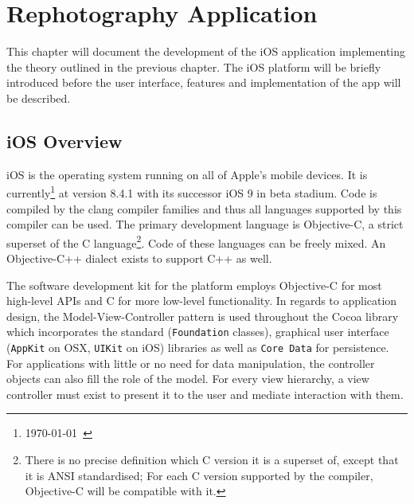 \chapter{Rephotography Application}

This chapter will document the development of the iOS application implementing
the theory outlined in the previous chapter. The iOS platform will be briefly
introduced before the user interface, features and implementation of the app
will be described.

\section{iOS Overview}
\newcommand*{\code}[1]{\texttt{#1}}

iOS is the operating system running on all of Apple's mobile devices. It is
currently\footnote{\today\ \citep{ios8}} at version 8.4.1 with its successor iOS
9 in beta stadium. Code is compiled by the clang compiler families and thus all
languages supported by this compiler can be used. The primary development
language is Objective-C, a strict superset of the C language\footnote{There is
   no precise definition which C version it is a superset of, except that it is
   ANSI standardised; For each C version supported by the compiler, Objective-C
will be compatible with it.}. Code of these languages can be freely mixed. An
Objective-C++ dialect exists to support C++ as well.

The software development kit for the platform employs Objective-C for most
high-level APIs and C for more low-level functionality. In regards to
application design, the Model-View-Controller pattern is used throughout the
Cocoa library which incorporates the standard (\code{Foundation} classes),
graphical user interface (\code{AppKit} on OSX, \code{UIKit} on iOS)
libraries as well as \code{Core Data} for persistence. For applications with
little or no need for data manipulation, the controller objects can also fill
the role of the model.  For every view hierarchy, a view controller must exist
to present it to the user and mediate interaction with them.


